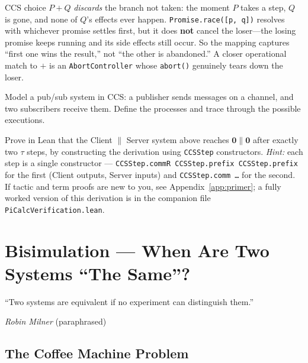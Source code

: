 \documentclass[11pt, a4paper, oneside]{book}
\newcommand{\nil}{\mathbf{0}}
\newcommand{\Par}{\mathbin{\|}}
\newcommand{\lc}[1]{\texttt{#1}}
\newcounter{exercise}[chapter]
\begin{document}
\begin{warning}[title={The \lc{Promise.race} analogy is imperfect}]
CCS choice $P + Q$ \emph{discards} the branch not taken: the moment $P$ takes
a step, $Q$ is gone, and none of $Q$'s effects ever happen.
\lc{Promise.race([p, q])} resolves with whichever promise settles first, but
it does \textbf{not} cancel the loser---the losing promise keeps running and
its side effects still occur. So the mapping captures ``first one wins the
result,'' not ``the other is abandoned.'' A closer operational match to $+$ is
an \lc{AbortController} whose \lc{abort()} genuinely tears down the loser.
\end{warning}

\begin{exercisebox}[title={Exercise 3.1}]
Model a pub/sub system in CCS: a publisher sends messages on a channel, and
two subscribers receive them. Define the processes and trace through the
possible executions.
\end{exercisebox}

\begin{exercisebox}[title={Exercise 3.2}]
Prove in Lean that the Client $\|$ Server system above reaches
$\nil \Par \nil$ after exactly two $\tau$ steps, by constructing the
derivation using \lc{CCSStep} constructors. \emph{Hint:} each step is a single
constructor --- \lc{CCSStep.commR CCSStep.prefix CCSStep.prefix} for the first
(Client outputs, Server inputs) and \lc{CCSStep.comm …} for the second. If
tactic and term proofs are new to you, see Appendix~\ref{app:primer}; a fully
worked version of this derivation is in the companion file
\lc{PiCalcVerification.lean}.
\end{exercisebox}

\chapter{Bisimulation --- When Are Two Systems ``The Same''?}

\epigraph{``Two systems are equivalent if no experiment can distinguish
them.''}{\textit{Robin Milner} (paraphrased)}

\section{The Coffee Machine Problem}
\end{document}
